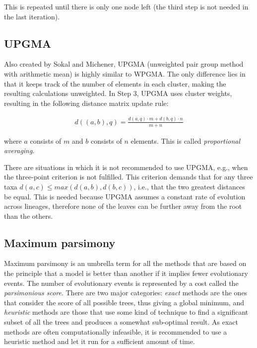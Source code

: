 \documentclass[11pt,twocolumn]{article}
\begin{document}
This is repeated until there is only one node left (the third step is not needed in the last iteration).

\subsection{UPGMA}

Also created by Sokal and Michener, UPGMA (unweighted pair group method with arithmetic mean) is highly similar to WPGMA. The only difference lies in that it keeps track of the number of elements in each cluster, making the resulting calculations unweighted. In Step 3, UPGMA uses cluster weights, resulting in the following distance matrix update rule:

\begin{align}
d((a, b), q) = \frac{d(a, q) \cdot m + d(b, q) \cdot n}{m + n}
\end{align}

where $a$ consists of $m$ and $b$ consists of $n$ elements. This is called \textit{proportional averaging}.

There are situations in which it is not recommended to use UPGMA, e.g., when the three-point criterion is not fulfilled. This criterion demands that for any three taxa $d(a, c) \le max(d(a, b), d(b, c))$, i.e., that the two greatest distances be equal. This is needed because UPGMA assumes a constant rate of evolution across lineages, therefore none of the leaves can be further away from the root than the others.

\subsection{Maximum parsimony}

Maximum parsimony is an umbrella term for all the methods that are based on the principle that a model is better than another if it implies fewer evolutionary events. The number of evolutionary events is represented by a cost called the \textit{parsimonious score}. There are two major categories: \textit{exact} methods are the ones that consider the score of all possible trees, thus giving a global minimum, and \textit{heuristic} methods are those that use some kind of technique to find a significant subset of all the trees and produces a somewhat sub-optimal result. As exact methods are often computationally infeasible, it is recommended to use a heuristic method and let it run for a sufficient amount of time.
\end{document}
